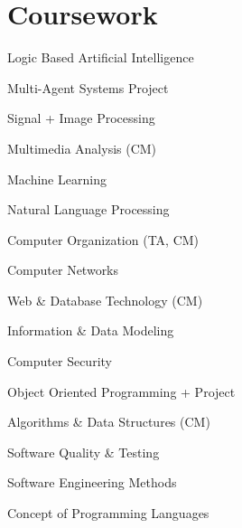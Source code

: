 \documentclass[]{deedy-resume-openfont}
\begin{document}
\begin{minipage}[t]{0.33\textwidth}

\section{Coursework}
\begin{small}
\vspace{0.6\topsep}
\begin{tightemize}
    \item Logic Based Artificial Intelligence
    \item Multi-Agent Systems Project
    \item Signal + Image Processing
    \item Multimedia Analysis (CM)
    \item Machine Learning
    \item Natural Language Processing
\end{tightemize}
\vspace{0.8\topsep}
\end{small}

\begin{small}
\vspace{0.6\topsep}
\begin{tightemize}
    \item Computer Organization (TA, CM)
    \item Computer Networks
\end{tightemize}
\vspace{0.8\topsep}
\end{small}

\begin{small}
\vspace{0.6\topsep}
\begin{tightemize}
    \item Web \& Database Technology (CM)
    \item Information \& Data Modeling
    \item Computer Security
\end{tightemize}
\vspace{0.8\topsep}
\end{small}

\begin{small}
\vspace{0.6\topsep}
\begin{tightemize}
    \item Object Oriented Programming + Project
    \item Algorithms \& Data Structures (CM)
    \item Software Quality \& Testing\
    \item Software Engineering Methods
    \item Concept of Programming Languages
\end{tightemize}
\vspace{0.8\topsep}
\end{small}


\end{minipage}
\end{document}

